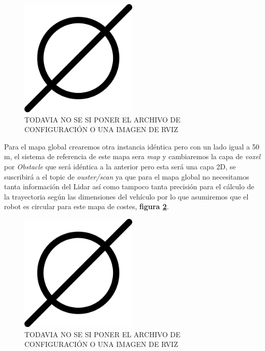 \begin{figure}[H]
    \centering
    \includegraphics[width=0.5\textwidth]{images/poner_foto.png}
    \caption{TODAVIA NO SE SI PONER EL ARCHIVO DE CONFIGURACIÓN O UNA IMAGEN DE RVIZ}
    \label{fig:mapa_local}
\end{figure}

Para el mapa global crearemos otra instancia idéntica pero con un lado igual a 50 m, el sistema de referencia de este mapa sera \textit{map} y cambiaremos 
la capa de \textit{voxel} por \textit{Obstacle} que será idéntica a la anterior pero esta será una capa 2D, se 
suscribirá a el topic de \textit{ouster/scan} ya que para el mapa global no necesitamos tanta información del Lidar así como tampoco tanta precisión para el 
cálculo de la trayectoria según las dimensiones del vehículo por lo que asumiremos que el robot es circular para este mapa de costes, \textbf{figura \ref{fig:mapa_global}}.

\begin{figure}[H]
    \centering
    \includegraphics[width=0.5\textwidth]{images/poner_foto.png}
    \caption{TODAVIA NO SE SI PONER EL ARCHIVO DE CONFIGURACIÓN O UNA IMAGEN DE RVIZ}
    \label{fig:mapa_global}
\end{figure}

